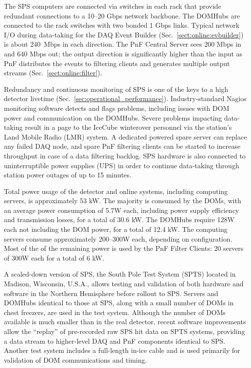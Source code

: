 The SPS computers are connected via switches in each rack that provide
redundant connections to a 10--20 Gbps network backbone.  The DOMHubs are
connected to the rack switches with two bonded 1 Gbps links.  Typical network I/O during
data-taking for the DAQ Event Builder (Sec.~\ref{sect:online:evbuilder}) is about 240~Mbps in each direction.
The PnF Central Server sees 200 Mbps in and 640 Mbps out; the output
direction is significantly higher than the input as PnF distributes the
events to filtering clients and generates multiple output streams
(Sec.~\ref{sect:online:filter}).  

Redundancy and continuous monitoring of SPS is one of the keys to a high
detector livetime (Sec.~\ref{sec:operational_performance}).
Industry-standard Nagios monitoring software detects and flags problems, 
including issues with DOM power and communication on the DOMHubs.  Severe
problems impacting data-taking result in a page to the IceCube winterover 
personnel via the station's Land Mobile Radio (LMR) system.  A dedicated
powered spare server can replace any failed DAQ node, and spare PnF filtering
clients can be started to increase throughput in case of a data filtering
backlog.  SPS hardware is also connected to uninterruptible
power supplies (UPS) in order to continue data-taking through station power
outages of up to 15 minutes.

Total power usage of the detector and online systems, including computing servers, is
approximately 53 kW.  The majority is consumed by the DOMs, with an
average power consumption of 5.7W each, including power supply efficiency
and transmission losses, for a total of 30.6 kW.  The DOMHubs require 128W
each not including the DOM power, for a total of 12.4 kW.  The
computing servers consume approximately 200--300W each, depending on
configuration.  Most of the of the remaining power is used by the PnF
Filter Clients: 20 servers of 300W each for a total of 6 kW.

A scaled-down version of SPS, the South Pole Test System (SPTS) located in
Madison, Wisconsin, U.S.A., allows testing and validation of both hardware
and software in the Northern Hemisphere before rollout to SPS.  Servers and DOMHubs
identical to those at SPS, along with a small number of DOMs in chest
freezers, are used in the test system.  Although the number of DOMs
available is much smaller than in the real detector, recent software
improvements allow the ``replay'' of pre-recorded raw SPS hit data
on SPTS systems, providing a data stream to higher-level DAQ and PnF
components identical to SPS.  Another test system includes a full-length
in-ice cable and is used primarily for validation of DOM communications and
timing.

